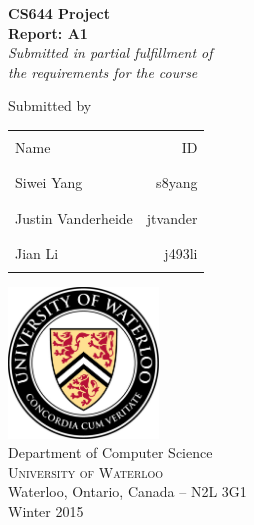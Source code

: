 \documentclass[12pt,letterpaper]{article}
\begin{document}
\begin{titlepage}
\begin{center}

\Large \textbf { {\bf CS644 Project} \\ Report: A1}\\[0.5in]

       \small \emph{Submitted in partial fulfillment of\\
        the requirements for the course}
        \vspace{.2in}

\normalsize Submitted by \\
\begin{table}[h]
\centering
\begin{tabular}{lr}\hline \\
Name & ID\\ \\ \hline
\\
Siwei Yang & s8yang \\ \\ \hline
\\
Justin Vanderheide & jtvander \\ \\ \hline
\\
Jian Li & j493li \\ \\ \hline
\end{tabular}
\end{table}

\vfill

\includegraphics[width=0.3\textwidth]{../res/UWLogo}\\[1.1in]
\Large{Department of Computer Science}\\
\normalsize
\textsc{University of Waterloo}\\
Waterloo, Ontario, Canada -- N2L 3G1 \\
\vspace{0.2cm}
Winter 2015

\end{center}
\end{titlepage}
\end{document}
